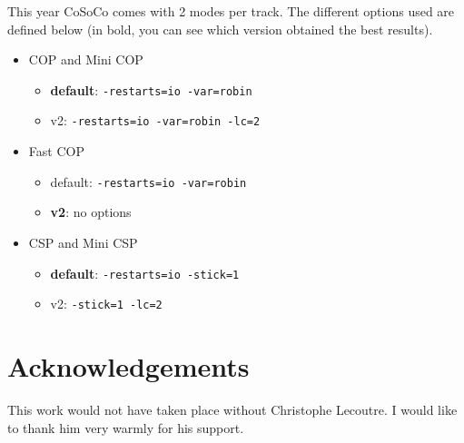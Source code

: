 \documentclass{llncs}
\begin{document}
 

\medskip
This year CoSoCo comes with 2 modes per track. The different options used are defined below (in bold, you can see which version obtained the best results).

\begin{itemize}
  \item     COP and Mini COP
    \begin{itemize}
    \item   {\bf default}: {\tt -restarts=io -var=robin}
    \item v2: {\tt -restarts=io -var=robin -lc=2}
    \end{itemize}
  \item Fast COP
    \begin{itemize}
    \item default: {\tt -restarts=io -var=robin}
    \item {\bf v2}: no options
    \end{itemize}
  \item CSP and Mini CSP
    \begin{itemize}
    \item \textbf{default}: {\tt  -restarts=io -stick=1}
      \item v2: {\tt -stick=1 -lc=2}
    \end{itemize}
\end{itemize}





\section*{Acknowledgements}
This work would not have taken place without Christophe Lecoutre. I  would like to thank him  very warmly for his support.



\end{document}
